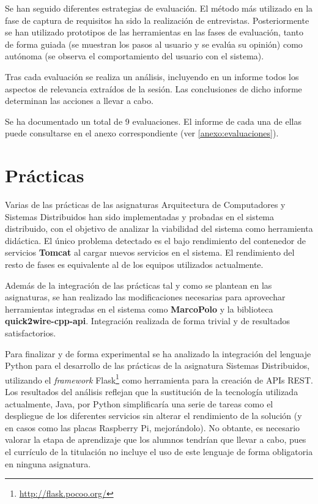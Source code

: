 Se han seguido diferentes estrategias de evaluación. El método más utilizado en la fase de captura de requisitos ha sido la realización de entrevistas. Posteriormente se han utilizado prototipos de las herramientas en las fases de evaluación, tanto de forma guiada (se muestran los pasos al usuario y se evalúa su opinión) como autónoma (se observa el comportamiento del usuario con el sistema).

Tras cada evaluación se realiza un análisis, incluyendo en un informe todos los aspectos de relevancia extraídos de la sesión. Las conclusiones de dicho informe determinan las acciones a llevar a cabo.

Se ha documentado un total de 9 evaluaciones. El informe de cada una de ellas puede consultarse en el anexo correspondiente (ver \ref{anexo:evaluaciones}).

\section{Prácticas}

Varias de las prácticas de las asignaturas Arquitectura de Computadores y Sistemas Distribuidos han sido implementadas y probadas en el sistema distribuido, con el objetivo de analizar la viabilidad del sistema como herramienta didáctica. El único problema detectado es el bajo rendimiento del contenedor de servicios \textbf{Tomcat} al cargar nuevos servicios en el sistema. El rendimiento del resto de fases es equivalente al de los equipos utilizados actualmente.

Además de la integración de las prácticas tal y como se plantean en las asignaturas, se han realizado las modificaciones necesarias para aprovechar herramientas integradas en el sistema como \textbf{MarcoPolo} y la biblioteca \textbf{quick2wire-cpp-api}. Integración realizada de forma trivial y de resultados satisfactorios.

Para finalizar y de forma experimental se ha analizado la integración del lenguaje Python para el desarrollo de las prácticas de la asignatura Sistemas Distribuidos, utilizando el \textit{framework} Flask\footnote{\href{http://flask.pocoo.org/}{http://flask.pocoo.org/}} como herramienta para la creación de APIs REST. Los resultados del análisis reflejan que la sustitución de la tecnología utilizada actualmente, Java, por Python simplificaría una serie de tareas como el despliegue de los diferentes servicios sin alterar el rendimiento de la solución (y en casos como las placas Raspberry Pi, mejorándolo). No obtante, es necesario valorar la etapa de aprendizaje que los alumnos tendrían que llevar a cabo, pues el currículo de la titulación no incluye el uso de este lenguaje de forma obligatoria en ninguna asignatura.

